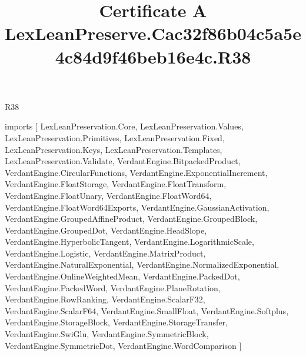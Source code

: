 \begin{lexlean}{R38}
\title{Certificate A LexLeanPreserve.Cac32f86b04c5a5e4c84d9f46beb16e4c.R38}
\begin{coremodule}
imports [
  LexLeanPreservation.Core,
  LexLeanPreservation.Values,
  LexLeanPreservation.Primitives,
  LexLeanPreservation.Fixed,
  LexLeanPreservation.Keys,
  LexLeanPreservation.Templates,
  LexLeanPreservation.Validate,
  VerdantEngine.BitpackedProduct,
  VerdantEngine.CircularFunctions,
  VerdantEngine.ExponentialIncrement,
  VerdantEngine.FloatStorage,
  VerdantEngine.FloatTransform,
  VerdantEngine.FloatUnary,
  VerdantEngine.FloatWord64,
  VerdantEngine.FloatWord64Exports,
  VerdantEngine.GaussianActivation,
  VerdantEngine.GroupedAffineProduct,
  VerdantEngine.GroupedBlock,
  VerdantEngine.GroupedDot,
  VerdantEngine.HeadSlope,
  VerdantEngine.HyperbolicTangent,
  VerdantEngine.LogarithmicScale,
  VerdantEngine.Logistic,
  VerdantEngine.MatrixProduct,
  VerdantEngine.NaturalExponential,
  VerdantEngine.NormalizedExponential,
  VerdantEngine.OnlineWeightedMean,
  VerdantEngine.PackedDot,
  VerdantEngine.PackedWord,
  VerdantEngine.PlaneRotation,
  VerdantEngine.RowRanking,
  VerdantEngine.ScalarF32,
  VerdantEngine.ScalarF64,
  VerdantEngine.SmallFloat,
  VerdantEngine.Softplus,
  VerdantEngine.StorageBlock,
  VerdantEngine.StorageTransfer,
  VerdantEngine.SwiGlu,
  VerdantEngine.SymmetricBlock,
  VerdantEngine.SymmetricDot,
  VerdantEngine.WordComparison
]


\end{coremodule}
\end{lexlean}
